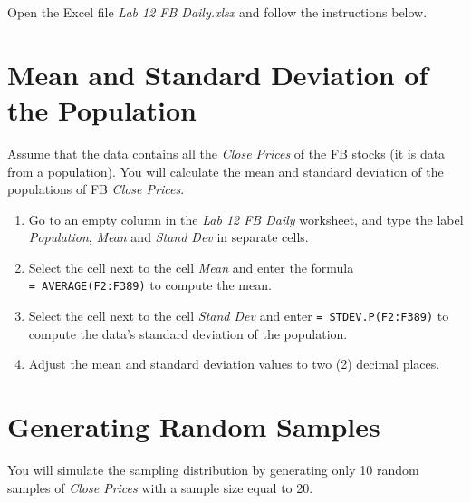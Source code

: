 \documentclass[
]{book}
\providecommand{\tightlist}{%
  \setlength{\itemsep}{0pt}\setlength{\parskip}{0pt}}
\begin{document}
Open the Excel file \emph{Lab 12 FB Daily.xlsx} and follow the instructions below.

\hypertarget{mean-stdev-population}{%
\section{Mean and Standard Deviation of the Population}\label{mean-stdev-population}}

Assume that the data contains all the \emph{Close Prices} of the FB stocks (it is data from a population). You will calculate the mean and standard deviation of the populations of FB \emph{Close Prices}.

\begin{enumerate}
\def\labelenumi{\arabic{enumi}.}
\tightlist
\item
  Go to an empty column in the \emph{Lab 12 FB Daily} worksheet, and type the label \emph{Population}, \emph{Mean} and \emph{Stand Dev} in separate cells.
\item
  Select the cell next to the cell \emph{Mean} and enter the formula \texttt{=\ AVERAGE(F2:F389)} to compute the mean.
\item
  Select the cell next to the cell \emph{Stand Dev} and enter \texttt{=\ STDEV.P(F2:F389)} to compute the data's standard deviation of the population.
\item
  Adjust the mean and standard deviation values to two (2) decimal places.
\end{enumerate}

\hypertarget{generating-random-samples}{%
\section{Generating Random Samples}\label{generating-random-samples}}

You will simulate the sampling distribution by generating only 10 random samples of \emph{Close Prices} with a sample size equal to 20.
\end{document}
